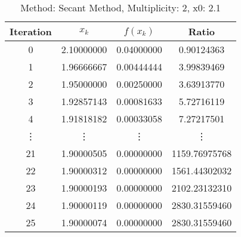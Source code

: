 \begin{table}
\centering
\caption{Method: Secant Method, Multiplicity: 2, x0: 2.1}
\label{tab:table_Secant_Method_2_2_1}
\begin{tabular}{c c c c}
\toprule
Iteration &      $x_k$ &   $f(x_k)$ &         Ratio \\
\midrule
        0 & 2.10000000 & 0.04000000 &    0.90124363 \\
        1 & 1.96666667 & 0.00444444 &    3.99839469 \\
        2 & 1.95000000 & 0.00250000 &    3.63913770 \\
        3 & 1.92857143 & 0.00081633 &    5.72716119 \\
        4 & 1.91818182 & 0.00033058 &    7.27217501 \\
   \vdots &     \vdots &     \vdots &        \vdots \\
       21 & 1.90000505 & 0.00000000 & 1159.76975768 \\
       22 & 1.90000312 & 0.00000000 & 1561.44302032 \\
       23 & 1.90000193 & 0.00000000 & 2102.23132310 \\
       24 & 1.90000119 & 0.00000000 & 2830.31559460 \\
       25 & 1.90000074 & 0.00000000 & 2830.31559460 \\
\bottomrule
\end{tabular}
\end{table}
